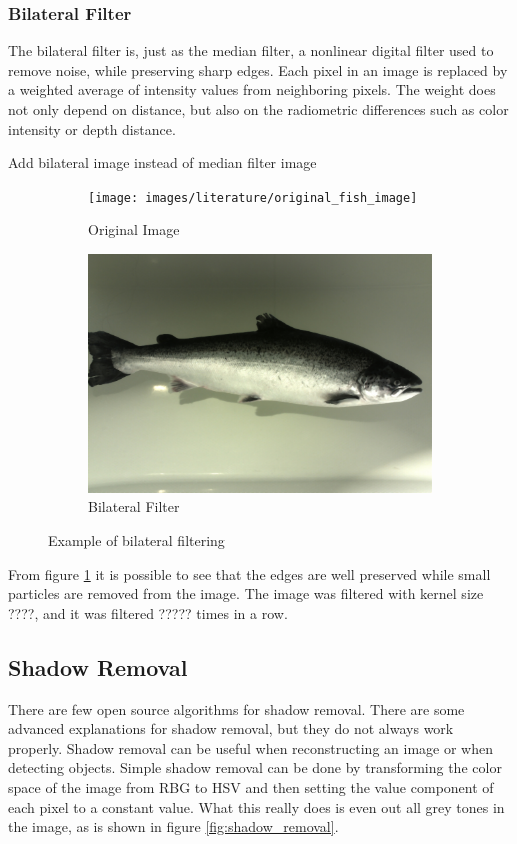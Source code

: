 \subsubsection{Bilateral Filter}
The bilateral filter is, just as the median filter, a nonlinear digital filter used to remove noise, while preserving sharp edges. Each pixel in an image is replaced by a weighted average of intensity values from neighboring pixels. The weight does not only depend on distance, but also on the radiometric differences such as color intensity or depth distance. 

{\color{red}Add bilateral image instead of median filter image}

\begin{figure}[h]
    \centering
    \begin{subfigure}{0.5\textwidth}
        \centering
        \texttt{[image: images/literature/original\_fish\_image]}
        \caption{Original Image}
    \end{subfigure}%
    \begin{subfigure}{.5\textwidth}
        \centering
        \includegraphics[width=.9\linewidth]{images/literature/median_filter}
        \caption{Bilateral Filter}
    \end{subfigure}
    \caption{Example of bilateral filtering}
    \label{fig:bilateral_filter}
\end{figure}

From figure \ref{fig:bilateral_filter} it is possible to see that the edges are well preserved while small particles are removed from the image. The image was filtered with kernel size {\color{red}????}, and it was filtered {\color{red}?????} times in a row.


\subsection{Shadow Removal}
There are few open source algorithms for shadow removal. There are some advanced explanations for shadow removal, but they do not always work properly. Shadow removal can be useful when reconstructing an image or when detecting objects. 
Simple shadow removal can be done by transforming the color space of the image from RBG to HSV and then setting the value component of each pixel to a constant value. What this really does is even out all grey tones in the image, as is shown in figure \ref{fig:shadow_removal}.

